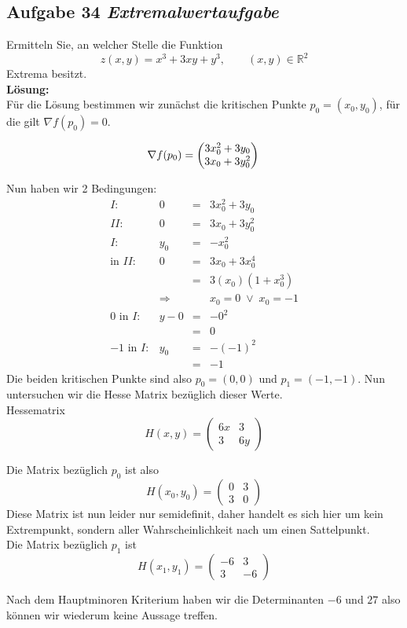 \subsection*{Aufgabe 34 \mdseries\itshape Extremalwertaufgabe}

   Ermitteln Sie, an welcher Stelle die Funktion
   $$
      z (x,y) = x^3 + 3xy + y^3, \qquad (x,y)\in \mathbb{R}^2
   $$
   Extrema besitzt.\\

\textbf{Lösung:}\\
   Für die Lösung bestimmen wir zunächst die kritischen Punkte $p_0 = (x_0,y_0)$, für die
   gilt $\nabla f(p_0) = 0$.

   $$
      \nabla f(p_0) = \begin{pmatrix} 3x_0^2 + 3y_0 \\ 3x_0 + 3y_0^2 \end{pmatrix}\\
   $$

   Nun haben wir 2 Bedingungen:
   $$\begin{array}{crcl}
      I:&0&=& 3x_0^2 + 3y_0\\
      II:&0&=& 3x_0 + 3y_0^2\\
      \hline
      I:&y_0&=& -x_0^2\\
      \text{in }II:&0&=& 3x_0 + 3x_0^4\\
         &&=&3 (x_0) (1+x_0^3)\\
      &\Rightarrow&& x_0=0 \; \lor \; x_0=-1\\
      \hline
      0\text{ in }I:&y-0&=& -0^2\\
         &&=&0\\
      -1\text{ in }I:&y_0&=& -(-1)^2\\
         &&=&-1
   \end{array}$$
   Die beiden kritischen Punkte sind also $p_0 = (0,0)$ und $p_1 = (-1,-1)$. Nun untersuchen wir die
   Hesse Matrix bezüglich dieser Werte.\\

   Hessematrix\\
   $$ H(x,y) = 
      \begin{pmatrix}
         6x & 3\\
         3 & 6y
      \end{pmatrix}
   $$

   Die Matrix bezüglich $p_0$ ist also
   $$H(x_0,y_0) = 
      \begin{pmatrix}
         0 & 3\\
         3 & 0
      \end{pmatrix}
   $$
   Diese Matrix ist nun leider nur semidefinit, daher handelt es sich hier um kein Extrempunkt,
   sondern aller Wahrscheinlichkeit nach um einen Sattelpunkt.\\

   Die Matrix bezüglich $p_1$ ist
   $$H(x_1,y_1)=
      \begin{pmatrix}
         -6 & 3\\
         3  & -6
      \end{pmatrix}
   $$

   Nach dem Hauptminoren Kriterium haben wir die Determinanten $-6$ und $27$ also können wir wiederum
   keine Aussage treffen.

